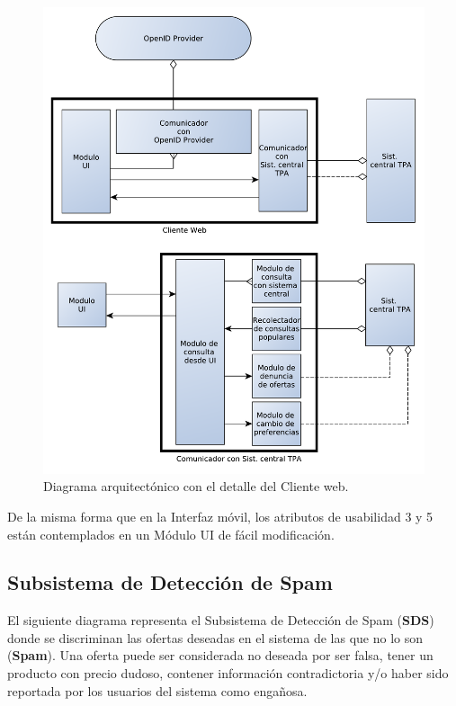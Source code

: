 \begin{figure}[H]
	\centering
	\includegraphics[width=\textwidth]{graficos/arch/Cliente_web.pdf}
	\caption{Diagrama arquitectónico con el detalle del \textsf{Cliente web}.}
\end{figure}

De la misma forma que en la Interfaz móvil, los atributos de usabilidad 3 y 5 están contemplados en un \textsf{Módulo UI} de fácil modificación.


\subsection{Subsistema de Detección de Spam}

El siguiente diagrama representa el Subsistema de Detección de Spam (\textbf{SDS}) donde se discriminan las ofertas deseadas en el sistema de las que no lo son (\textbf{Spam}). Una oferta puede ser considerada no deseada por ser falsa, tener un producto con precio dudoso, contener información contradictoria y/o haber sido reportada por los usuarios del sistema como enga\~{n}osa.

